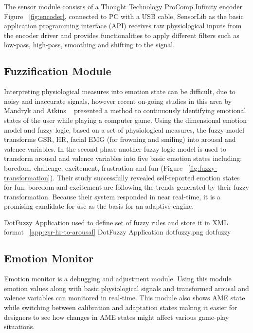 The sensor module consists of a Thought Technology ProComp Infinity encoder ~\cite{tt2013procomp} Figure ~\ref{fig:encoder}, connected to PC with a USB cable, SensorLib as the basic application programming interface (API) receives raw physiological inputs from the encoder driver and provides functionalities to apply different filters such as low-pass, high-pass, smoothing and shifting to the signal.

\subsection{Fuzzification Module} \label{subsec:fuzzi}
Interpreting physiological measures into emotion state can be difficult, due to noisy and inaccurate signals, however recent on-going studies in this area by Mandryk and Atkins ~\cite{mandryk2007fuzzy} presented a method to continuously identifying emotional states of the user while playing a computer game. Using the dimensional emotion model and fuzzy logic, based on a set of physiological measures, the fuzzy model transforms GSR, HR, facial EMG (for frowning and smiling) into arousal and valence variables. In the second phase another fuzzy logic model is used to transform arousal and valence variables into five basic emotion states including: boredom, challenge, excitement, frustration and fun (Figure ~\ref{fig:fuzzy-transformation}). Their study successfully revealed self-reported emotion states for fun, boredom and excitement are following the trends generated by their fuzzy transformation. %
Because their system responded in near real-time, it is a promising candidate for use as the basis for an adaptive engine.

\largeimg
{DotFuzzy Application used to define set of fuzzy rules and store it in XML format ~\ref{app:gsr-hr-to-arousal}}
{DotFuzzy Application}
{dotfuzzy.png}
{dotfuzzy}

\subsection{Emotion Monitor}
Emotion monitor is a debugging and adjustment module. Using this module emotion values along with basic physiological signals and transformed arousal and valence variables can monitored in real-time. This module also shows AME state while switching between calibration and adaptation states making it easier for designers to see how changes in AME states might affect various game-play situations.

